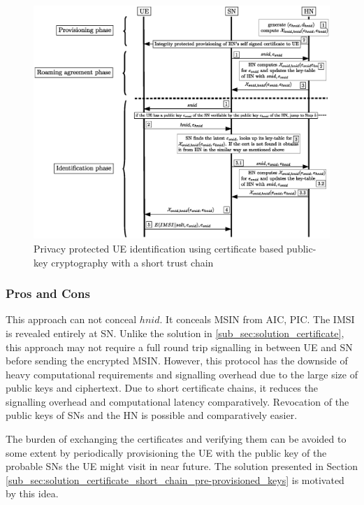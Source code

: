 \documentclass[12pt]{llncs}
\begin{document}
\begin{figure}
\begin{center}
  \includegraphics[width=.98\textwidth]{root-key2.eps}
\caption{Privacy protected UE identification using certificate based public-key cryptography with a short trust chain}
\label{fig:solution_certificate_short_chain}       %
\end{center}
\end{figure}

\subsubsection{Pros and Cons}
This approach can not conceal $hnid$. It conceals MSIN from AIC, PIC. The IMSI is revealed entirely at SN. Unlike the solution in \ref{sub_sec:solution_certificate}, this approach may not require a full round trip signalling in between UE and SN before sending the encrypted MSIN. However, this protocol has the downside of heavy computational requirements and signalling overhead due to the large size of public keys and ciphertext. Due to short certificate chains, it reduces the signalling overhead and computational latency comparatively. Revocation of the public keys of SNs and the HN is possible and comparatively easier. 

The burden of exchanging the certificates and verifying them can be avoided to some extent by periodically provisioning the UE with the public key of the probable SNs the UE might visit in near future. The solution presented in Section \ref{sub_sec:solution_certificate_short_chain_pre-provisioned_keys} is motivated by this idea.
\end{document}
